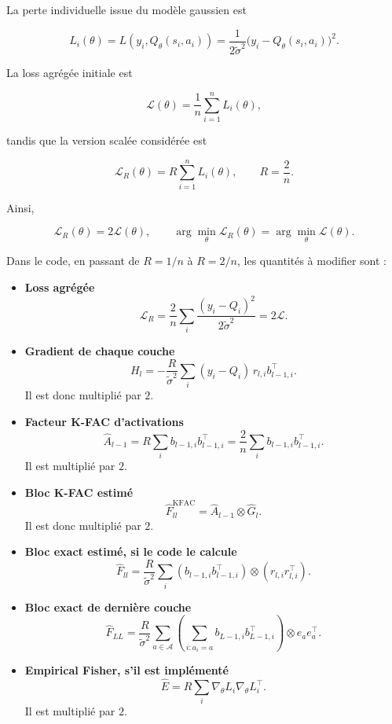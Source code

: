 La perte individuelle issue du modèle gaussien est

\[
L_i(\theta)
=
L(y_i,Q_\theta(s_i,a_i))
=
\frac{1}{2\widetilde\sigma^2}
\bigl(y_i-Q_\theta(s_i,a_i)\bigr)^2.
\]

La loss agrégée initiale est

\[
\mathcal L(\theta)
=
\frac1n\sum_{i=1}^n L_i(\theta),
\]

tandis que la version scalée considérée est

\[
\mathcal L_R(\theta)
=
R\sum_{i=1}^n L_i(\theta),
\qquad
R=\frac2n.
\]

Ainsi,

\[
\mathcal L_R(\theta)=2\mathcal L(\theta),
\qquad
\arg\min_\theta\mathcal L_R(\theta)
=
\arg\min_\theta\mathcal L(\theta).
\]

Dans le code, en passant de $R=1/n$ à $R=2/n$, les quantités à modifier sont :

\begin{itemize}
    \item \textbf{Loss agrégée}
    \[
    \mathcal L_R
    =
    \frac{2}{n}\sum_i
    \frac{(y_i-Q_i)^2}{2\widetilde\sigma^2}
    =
    2\mathcal L.
    \]

    \item \textbf{Gradient de chaque couche}
    \[
    H_l
    =
    -\frac{R}{\widetilde\sigma^2}
    \sum_i (y_i-Q_i)\,
    r_{l,i}b_{l-1,i}^\top.
    \]
    Il est donc multiplié par $2$.

    \item \textbf{Facteur K-FAC d’activations}
    \[
    \widehat A_{l-1}
    =
    R\sum_i b_{l-1,i}b_{l-1,i}^\top
    =
    \frac{2}{n}\sum_i b_{l-1,i}b_{l-1,i}^\top.
    \]
    Il est multiplié par $2$.

    \item \textbf{Bloc K-FAC estimé}
    \[
    \widehat F_{ll}^{\mathrm{KFAC}}
    =
    \widehat A_{l-1}\otimes\widehat G_l.
    \]
    Il est donc multiplié par $2$.

    \item \textbf{Bloc exact estimé, si le code le calcule}
    \[
    \widehat F_{ll}
    =
    \frac{R}{\widetilde\sigma^2}
    \sum_i
    (b_{l-1,i}b_{l-1,i}^\top)
    \otimes
    (r_{l,i}r_{l,i}^\top).
    \]

    \item \textbf{Bloc exact de dernière couche}
    \[
    \widehat F_{LL}
    =
    \frac{R}{\widetilde\sigma^2}
    \sum_{a\in\mathcal A}
    \left(
    \sum_{i:a_i=a}
    b_{L-1,i}b_{L-1,i}^\top
    \right)
    \otimes e_ae_a^\top.
    \]

    \item \textbf{Empirical Fisher, s’il est implémenté}
    \[
    \widehat E
    =
    R\sum_i
    \nabla_\theta L_i\nabla_\theta L_i^\top.
    \]
    Il est multiplié par $2$.
\end{itemize}

